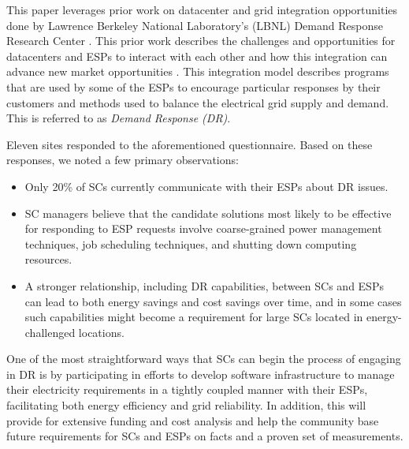 This paper %
leverages prior work on datacenter and grid integration opportunities
done by Lawrence Berkeley National Laboratory's (LBNL) Demand Response 
Research Center \cite{LBNL}. This prior work describes the challenges and opportunities for datacenters and %
ESPs to interact with each other and how this integration can advance 
new market opportunities \cite{Ghatikar2012a, Ghatikar2012b}. 
This integration model describes programs that are used by some of the ESPs %
to encourage particular responses by their customers and methods 
used to balance the electrical grid supply and demand. This is referred to as \emph{Demand Response (DR)}.

Eleven sites responded to the aforementioned questionnaire. Based on these responses, we noted a few
primary observations:
\begin{itemize}
\item Only 20\% of SCs currently communicate with their ESPs about DR issues.
\item SC managers believe that the candidate solutions most likely to be effective for
responding to ESP requests involve coarse-grained power management techniques, job
scheduling techniques, and shutting down computing resources.
\item A stronger relationship, including DR capabilities, between SCs and
ESPs can lead to both energy savings and cost savings over time, and in some
cases such capabilities might become a requirement for large SCs located in energy-challenged
locations.
\end{itemize}


One of the most straightforward ways that SCs can begin
the process of engaging %
in DR is by participating in efforts to
develop software 
infrastructure to manage their electricity requirements in a tightly coupled manner 
with their ESPs, facilitating both energy efficiency and grid reliability. In addition, this will provide for extensive funding and cost analysis and help the community base future requirements for SCs and ESPs on facts and a proven set of measurements.

